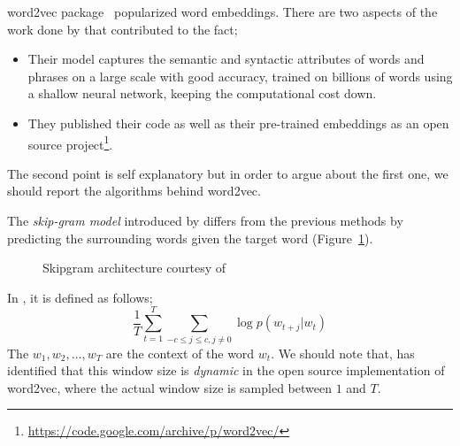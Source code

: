 word2vec package~\cite{mikolov_efficient_2013,mikolov_distributed_2013,mikolov_linguistic_2013} popularized word embeddings.
There are two aspects of the work done by \citeauthor{mikolov_distributed_2013}  that contributed to the fact;
\begin{itemize}
    \item Their model captures the semantic and syntactic attributes of words and phrases on a large scale with good accuracy, trained on billions of words using a shallow neural network, keeping the computational cost down.
    \item They published their code as well as their pre-trained embeddings as an open source project\footnote{\url{https://code.google.com/archive/p/word2vec/}}.
\end{itemize}
The second point is self explanatory but in order to argue about the first one, we should report the algorithms behind word2vec.

The \emph{skip-gram model} introduced by \textcite{mikolov_efficient_2013} differs from the previous methods by predicting the surrounding words given the target word (Figure~\ref{fig:skipgram}).
\begin{figure}[htbp]
    \centering
    \caption{Skipgram architecture courtesy of \textcite{mikolov_distributed_2013}}%
    \label{fig:skipgram}
\end{figure}
In , it is defined as follows;
\begin{equation}
    \frac{1}{T}\sum_{t=1}^{T}\sum_{-c \leq j \leq c, j \neq 0} \log p(w_{t+j}|w_t)
\end{equation}
The $w_{1}, w_{2}, \dots, w_{T}$ are the context of the word $w_t$.
We should note that, \textcite{levy_improving_2015} has identified that this window size is \emph{dynamic} in the open source implementation of word2vec, where the actual window size is sampled between $1$ and $T$.


